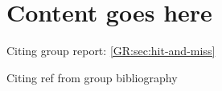 \section{Content goes here}
Citing group report:
\autoref*{GR:sec:hit-and-miss}

Citing ref from group bibliography
\cite{ale_general_2013}